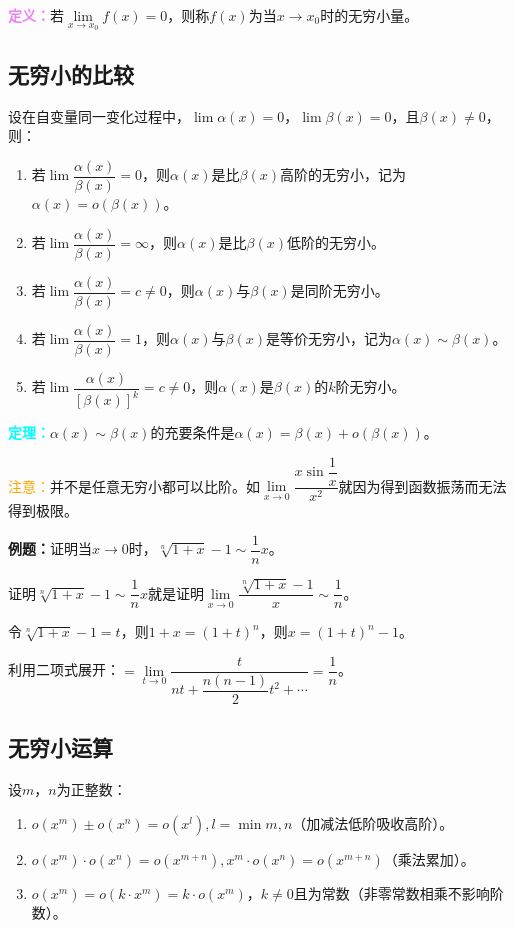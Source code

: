 \documentclass[UTF8, 12pt]{ctexart}
\begin{document}
\textcolor{violet}{\textbf{定义：}}若$\lim\limits_{x\to x_0}f(x)=0$，则称$f(x)$为当$x\to x_0$时的无穷小量。

\subsection{无穷小的比较}

设在自变量同一变化过程中，$\lim\alpha(x)=0$，$\lim\beta(x)=0$，且$\beta(x)\neq 0$，则：

\begin{enumerate}
    \item 若$\lim\dfrac{\alpha(x)}{\beta(x)}=0$，则$\alpha(x)$是比$\beta(x)$高阶的无穷小，记为$\alpha(x)=o(\beta(x))$。
    \item 若$\lim\dfrac{\alpha(x)}{\beta(x)}=\infty$，则$\alpha(x)$是比$\beta(x)$低阶的无穷小。
    \item 若$\lim\dfrac{\alpha(x)}{\beta(x)}=c\neq 0$，则$\alpha(x)$与$\beta(x)$是同阶无穷小。
    \item 若$\lim\dfrac{\alpha(x)}{\beta(x)}=1$，则$\alpha(x)$与$\beta(x)$是等价无穷小，记为$\alpha(x)\sim\beta(x)$。
    \item 若$\lim\dfrac{\alpha(x)}{[\beta(x)]^k}=c\neq 0$，则$\alpha(x)$是$\beta(x)$的$k$阶无穷小。
\end{enumerate}

\textcolor{aqua}{\textbf{定理：}}$\alpha(x)\sim\beta(x)$的充要条件是$\alpha(x)=\beta(x)+o(\beta(x))$。

\textcolor{orange}{注意：}并不是任意无穷小都可以比阶。如$\lim\limits_{x\to 0}\dfrac{x\sin\dfrac{1}{x}}{x^2}$就因为得到函数振荡而无法得到极限。

\textbf{例题：}证明当$x\to 0$时，$\sqrt[n]{1+x}-1\sim\dfrac{1}{n}x$。

证明$\sqrt[n]{1+x}-1\sim\dfrac{1}{n}x$就是证明$\lim\limits_{x\to 0}\dfrac{\sqrt[n]{1+x}-1}{x}\sim\dfrac{1}{n}$。

令$\sqrt[n]{1+x}-1=t$，则$1+x=(1+t)^n$，则$x=(1+t)^n-1$。

利用二项式展开：$=\lim\limits_{t\to 0}\dfrac{t}{nt+\dfrac{n(n-1)}{2}t^2+\cdots}=\dfrac{1}{n}$。

\subsection{无穷小运算}

设$m$，$n$为正整数：

\begin{enumerate}
    \item $o(x^m)\pm o(x^n)=o(x^l),l=\min{m,n}$（加减法低阶吸收高阶）。
    \item $o(x^m)\cdot o(x^n)=o(x^{m+n}),x^m\cdot o(x^n)=o(x^{m+n})$（乘法累加）。
    \item $o(x^m)=o(k\cdot x^m)=k\cdot o(x^m)$，$k\neq 0$且为常数（非零常数相乘不影响阶数）。
\end{enumerate}
\end{document}

